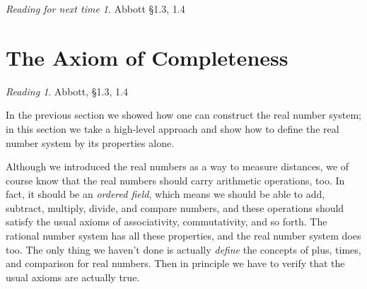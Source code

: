 \documentclass[11pt,oneside]{amsbook}
\newcommand{\set}[1]{\left\{\,#1\,\right\}}
\theoremstyle{definition}
\newtheorem{exerc}{Exercise}[section]
\theoremstyle{plain}
\theoremstyle{definition}
\theoremstyle{remark}
\newtheorem*{reading}{Reading}
\newtheorem*{readnext}{Reading for next time}
\numberwithin{equation}{section}
\numberwithin{figure}{section}
\begin{document}
%



\vspace{\fill}
\begin{readnext}
  Abbott \S 1.3, 1.4
\end{readnext}


\newpage
\section{The Axiom of Completeness}

\begin{reading}
  Abbott, \S 1.3, 1.4
\end{reading}

In the previous section we showed how one can construct the real number system; in this section we take a high-level approach and show how to define the real number system by its properties alone.

Although we introduced the real numbers as a way to measure distances, we of course know that the real numbers should carry arithmetic operations, too. In fact, it should be an \emph{ordered field}, which means we should be able to add, subtract, multiply, divide, and compare numbers, and these operations should satisfy the usual axioms of associativity, commutativity, and so forth. The rational number system has all these properties, and the real number system does too. The only thing we haven't done is actually \emph{define} the concepts of plus, times, and comparison for real numbers. Then in principle we have to verify that the usual axioms are actually true.
\end{document}
